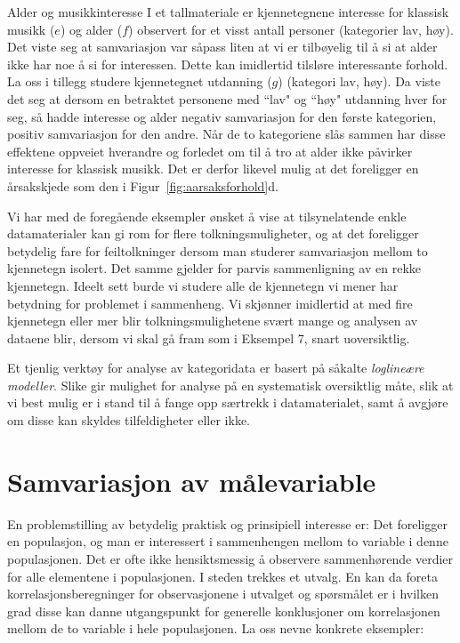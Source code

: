 \begin{eksempel}{Alder og musikkinteresse}
I et tallmateriale er kjennetegnene interesse for klassisk musikk ($e$)
og alder ($f$) observert for et visst antall personer (kategorier lav,
høy).  Det viste seg at samvariasjon var såpass liten at vi er 
tilbøyelig til å si at alder ikke har noe å si for
interessen.  Dette kan imidlertid tilsløre interessante forhold.  La
oss i tillegg studere kjennetegnet utdanning ($g$) (kategori lav, høy).
Da viste det seg at dersom en betraktet personene med ``lav" og ``høy"
utdanning hver for seg, så hadde interesse og alder negativ
samvariasjon for den første kategorien, positiv samvariasjon for
den andre.  Når de to kategoriene slås sammen har disse effektene
oppveiet hverandre og forledet om til å tro at alder ikke påvirker
interesse for klassisk musikk.  Det er derfor likevel mulig at det foreligger
en årsakskjede som den i Figur~\ref{fig:aarsaksforhold}d.
\end{eksempel}

Vi har med de foregående eksempler ønsket å vise at tilsynelatende 
enkle datamaterialer kan gi rom for flere tolkningsmuligheter, og at det
foreligger betydelig fare for feiltolkninger dersom man studerer
samvariasjon mellom to kjennetegn isolert.  Det samme gjelder for parvis
sammenligning av en rekke kjennetegn.  Ideelt sett burde vi studere alle
de kjennetegn vi mener har betydning for problemet i sammenheng.  Vi
skjønner imidlertid at med fire kjennetegn eller mer blir
tolkningsmulighetene svært mange og analysen av dataene blir, dersom
vi skal gå fram som i Eksempel 7, snart uoversiktlig. 

Et tjenlig verktøy for analyse av kategoridata er basert på såkalte
{\em  loglineære modeller}.
Slike gir mulighet for analyse på en systematisk oversiktlig
måte, slik at vi best mulig er i stand til å fange opp 
særtrekk i datamaterialet, samt å avgjøre om disse 
kan skyldes tilfeldigheter eller ikke.


\section{Samvariasjon av målevariable}

En problemstilling av betydelig praktisk og prinsipiell interesse er:
Det foreligger en populasjon, og man er interessert i sammenhengen mellom
to variable i denne populasjonen.  Det er ofte ikke hensiktsmessig å
observere sammenhørende verdier for alle elementene i populasjonen.
I steden trekkes et utvalg.  En kan da foreta korrelasjonsberegninger
for observasjonene i utvalget og spørsmålet er i hvilken grad disse
kan danne utgangspunkt for generelle konklusjoner om korrelasjonen 
mellom de to variable i hele populasjonen. La oss nevne konkrete eksempler:

